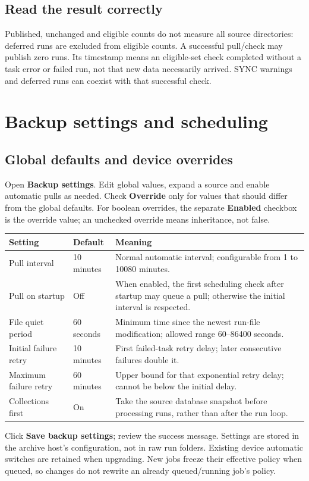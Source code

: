 \documentclass[11pt,oneside,openany]{book}
\newcommand{\ui}[1]{\textbf{#1}}
\begin{document}
\section{Read the result correctly}
Published, unchanged and eligible counts do not measure all source directories:
deferred runs are excluded from eligible counts. A successful pull/check may publish
zero runs. Its timestamp means an eligible-set check completed without a task error
or failed run, not that new data necessarily arrived. SYNC warnings and deferred runs
can coexist with that successful check.

\chapter{Backup settings and scheduling}
\section{Global defaults and device overrides}
Open \ui{Backup settings}. Edit global values, expand a source and enable automatic
pulls as needed. Check \ui{Override} only for values that should differ from the
global defaults. For boolean overrides, the separate \ui{Enabled} checkbox is the
override value; an unchecked override means inheritance, not false.
\begin{longtable}{p{53mm}p{25mm}p{68mm}}\toprule
Setting&Default&Meaning\\\midrule\endhead
Pull interval&10 minutes&Normal automatic interval; configurable from 1 to 10080 minutes.\\
Pull on startup&Off&When enabled, the first scheduling check after startup may queue a pull; otherwise the initial interval is respected.\\
File quiet period&60 seconds&Minimum time since the newest run-file modification; allowed range 60--86400 seconds.\\
Initial failure retry&10 minutes&First failed-task retry delay; later consecutive failures double it.\\
Maximum failure retry&60 minutes&Upper bound for that exponential retry delay; cannot be below the initial delay.\\
Collections first&On&Take the source database snapshot before processing runs, rather than after the run loop.\\
\bottomrule\end{longtable}
Click \ui{Save backup settings}; review the success message. Settings are stored in
the archive host's configuration, not in raw run folders. Existing device automatic
switches are retained when upgrading. New jobs freeze their effective policy when
queued, so changes do not rewrite an already queued/running job's policy.
\end{document}

